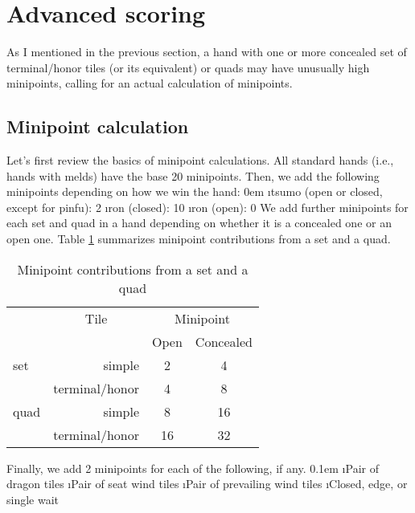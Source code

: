 \newpage

\section{Advanced scoring} \label{sec:scores2}

As I mentioned in the previous section, a hand with one or more concealed set of terminal/honor tiles (or its equivalent) or quads may have unusually high minipoints, calling for an actual calculation of minipoints. 

\subsection{Minipoint calculation}
	 
Let's first review the basics of minipoint calculations. 
All standard hands (i.e., hands with melds) have the base 20 minipoints. Then, we add the following minipoints depending on how we win the hand:
\bi \itemsep0em
\i {\jap tsumo} (open or closed, except for {\jap pinfu}): 2
\i {\jap ron} (closed): 10
\i {\jap ron} (open): 0
\ei 
We add further minipoints for each set and quad in a hand depending on whether it is a concealed one or an open one. Table \ref{tbl:minip_set} summarizes minipoint contributions from a set and a quad. 
{\begin{table}[h!]\centering\small\captionsetup{font=small}
\caption{Minipoint contributions from a set and a quad} \label{tbl:minip_set}
\begin{tabular}{l r c c}
\toprule
& \multicolumn{1}{c}{Tile} & \multicolumn{2}{c}{Minipoint}\\
&  & {\footnotesize Open} & {\footnotesize Concealed}\\
\midrule
set	& simple & 2 & 4\\
	& terminal/honor & 4 & 8\\
\midrule
quad	 & simple & 8 & 16\\
	& terminal/honor & 16 & 32\\
\bottomrule
\end{tabular}
\end{table}}

\newpage
\noindent Finally, we add 2 minipoints for each of the following, if any. 
\bi \itemsep0.1em
\i Pair of dragon tiles
\i Pair of seat wind tiles
\i Pair of prevailing wind tiles
\i Closed, edge, or single wait
\ei


